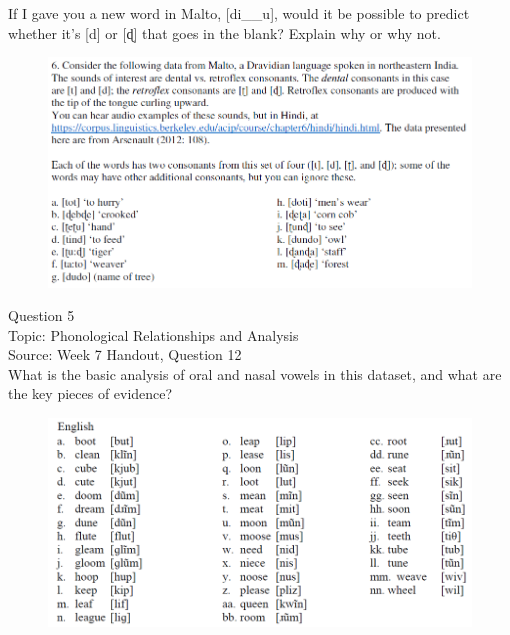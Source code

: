 \documentclass[12pt]{article}
\begin{document}
If I gave you a new word in Malto, [di\_\_u], would it be possible to predict whether it's [d] or [ɖ] that goes in the blank? Explain why or why not.\\

\begin{figure}[H]
\includegraphics{../images/malto.png}
\end{figure}

\newpage

{\large Question 5}\\

Topic: Phonological Relationships and Analysis\\
Source: Week 7 Handout, Question 12\\

What is the basic analysis of oral and nasal vowels in this dataset, and what are the key pieces of evidence?\\

\begin{figure}[H]
\includegraphics{../images/english12.png}
\end{figure}

\newpage

\begin{center}
\textbf{{\color{red}{\HUGE END OF EXAM}}}\\

\end{center}
\newpage
\end{document}
